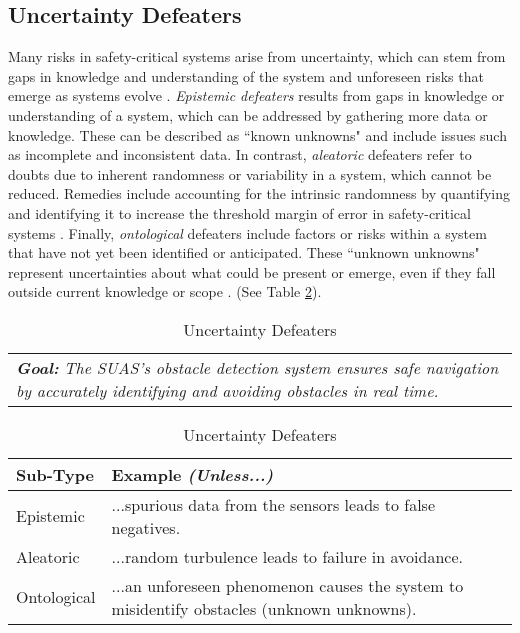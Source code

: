\subsection{Uncertainty Defeaters}

Many risks in safety-critical systems arise from uncertainty, which can stem from gaps in knowledge and understanding of the system and unforeseen risks that emerge as systems evolve \cite{ramirez2012taxonomy}. \emph{Epistemic defeaters} results from gaps in knowledge or understanding of a system, which can be addressed by gathering more data or knowledge. These can be described as ``known unknowns" and include issues such as incomplete and inconsistent data. In contrast, \emph{aleatoric} defeaters refer to doubts due to inherent randomness or variability in a system, which cannot be reduced. Remedies include accounting for the intrinsic randomness by quantifying and identifying it to increase the threshold margin of error in safety-critical systems \cite{duan2017reasoning}. Finally, \emph{ontological} defeaters include factors or risks within a system that have not yet been identified or anticipated. These ``unknown unknowns" represent uncertainties about what could be present or emerge, even if they fall outside current knowledge or scope \cite{rushby2015interpretation}. (See Table \ref{tab:uncertainty_defeaters}).

\begin{table}[]
\centering
\caption{Uncertainty Defeaters}
\begin{tabularx}{\linewidth}{ @{} X }
\toprule
 \textit{\textbf{Goal:}} \textit{The SUAS’s obstacle detection system ensures safe navigation by accurately identifying and avoiding obstacles in real time.} \\
\end{tabularx}

\begin{tabularx}{\linewidth}{@{} l X }
\toprule
\textbf{Sub-Type} & \textbf{Example \textit{(Unless...)}} \\
\midrule
Epistemic & ...spurious data from the sensors leads to false negatives.\\
Aleatoric & ...random turbulence leads to failure in avoidance.  \\
Ontological & ...an unforeseen phenomenon causes the system to misidentify obstacles (unknown unknowns). \\
\bottomrule
\end{tabularx}
\label{tab:uncertainty_defeaters}
\end{table}



